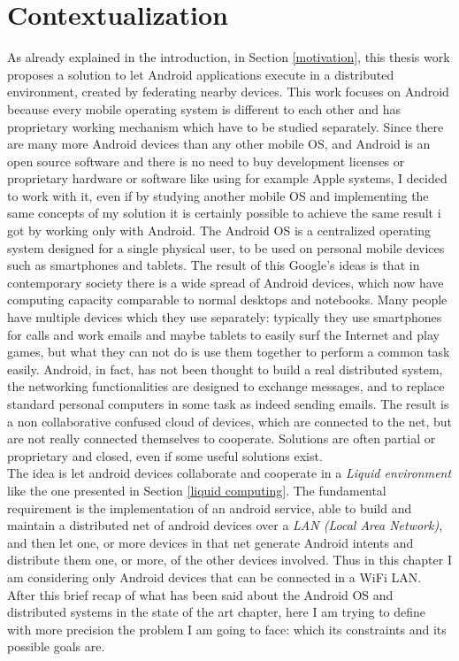 \section{Contextualization} \label{facedProblem}
As already explained in the introduction, in Section \ref{motivation}, this thesis work proposes a solution to let Android applications execute in a distributed environment, created by federating nearby devices. This work focuses on Android because every mobile operating system is different to each other and has proprietary working mechanism which have to be studied separately. Since there are many more Android devices than any other mobile OS, and Android is an open source software and there is no need to buy development licenses or proprietary hardware or software like using for example Apple systems, I decided to work with it, even if by studying another mobile OS and implementing the same concepts of my solution it is certainly possible to achieve the same result i got by working only with Android. 
The Android OS is a centralized operating system designed for a single physical user, to be used on personal mobile devices such as smartphones and tablets. The result of this Google's ideas is that in contemporary society there is a wide spread of Android devices, which now have computing capacity comparable to normal desktops and notebooks. Many people have multiple devices which they use separately: typically they use smartphones for calls and  work emails and maybe tablets to easily surf the Internet and play games, but what they can not do is use them together to perform a common task easily. Android, in fact, has not been thought to build a real distributed system, the networking functionalities are designed to exchange messages, and to replace standard personal computers in some task as indeed sending emails.
The result is a non collaborative confused cloud of devices, which are connected to the net, but are not really connected themselves to cooperate. Solutions are often partial or proprietary and closed, even if some useful solutions exist.\\
The idea is let android devices collaborate and cooperate in a \textit{Liquid environment} like the one presented in Section \ref{liquid computing}. The fundamental requirement is the implementation of an android service, able to build and maintain a distributed net of android devices over a \textit{LAN (Local Area Network)}, and then let one, or more devices in that net generate Android intents and distribute them one, or more, of the other devices involved. Thus in this chapter I am considering only Android devices that can be connected in a WiFi LAN.\\
After this brief recap of what has been said about the Android OS and distributed systems in the state of the art chapter, here I am trying to define with more precision the problem I am going to face: which its constraints and its possible goals are.


